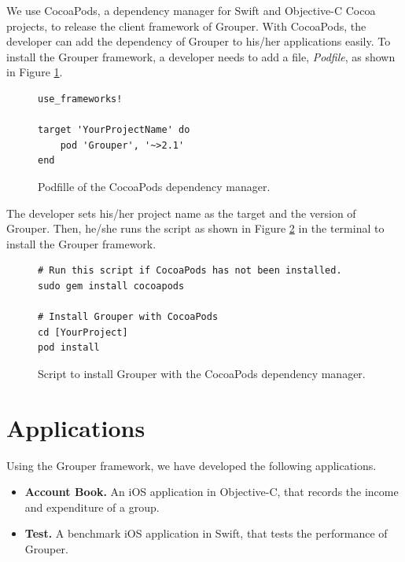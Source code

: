 \documentclass[a4paper,11pt]{report}
\begin{document}
We use CocoaPods\cite{cocoapods}, a dependency manager for Swift and Objective-C Cocoa projects, to release the client framework of Grouper.
With CocoaPods, the developer can add the dependency of Grouper to his/her applications easily.
To install the Grouper framework, a developer needs to add a file, \emph{Podfile}, as shown in Figure \ref{fig:podfile}.

\begin{figure}
\begin{lstlisting}[frame=none language=Ruby] 
use_frameworks!

target 'YourProjectName' do
    pod 'Grouper', '~>2.1'
end
\end{lstlisting}
\caption{Podfille of the CocoaPods dependency manager.}
\label{fig:podfile}
\end{figure}

The developer sets his/her project name as the target and the version of Grouper.
Then, he/she runs the script as shown in Figure \ref{fig:install_grouper} in the terminal to install the Grouper framework.

\begin{figure}
\begin{lstlisting}[frame=none language=shell] 
# Run this script if CocoaPods has not been installed.
sudo gem install cocoapods

# Install Grouper with CocoaPods
cd [YourProject]
pod install
\end{lstlisting}
\caption{Script to install Grouper with the CocoaPods dependency manager.}
\label{fig:install_grouper}
\end{figure}

\section{Applications} \label{section:application}

Using the Grouper framework, we have developed the following applications. 

\begin{itemize}
	\setlength{\itemsep}{1pt}
	\setlength{\parskip}{0pt}
	\setlength{\parsep}{0pt}
	\item \textbf{Account Book.} An iOS application in Objective-C, that records the income and expenditure of a group.
	\item \textbf{Test.} A benchmark iOS application in Swift, that tests the performance of Grouper.
\end{itemize}
\end{document}
